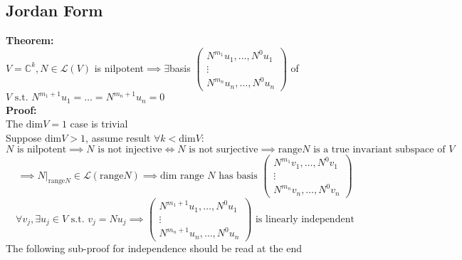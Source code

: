 \documentclass{article}
\newcommand{\st}{\mbox{ s.t. }}
\newcommand{\0}{{\bf{0}}}
\begin{document}
\subsection{Jordan Form}
\textbf{Theorem:}\\
$V=\mathbb{C}^k,N\in\mathcal{L}(V)$ is nilpotent$\implies\exists$basis $\begin{pmatrix}
    N^{m_1}u_1,\dots,N^0u_1\\
    \vdots\\
    N^{m_n}u_n,\dots,N^0u_n
\end{pmatrix}$ of $V\st N^{m_1+1}u_1=\dots=N^{m_n+1}u_n=0$\\
\textbf{Proof:}\\
The $\mbox{dim}V=1$ case is trivial\\
Suppose $\mbox{dim}V>1$, assume result $\forall k<\mbox{dim}V$:
$$N\mbox{ is nilpotent}\implies N\mbox{ is not injective}\iff N\mbox{ is not surjective}\implies\mbox{range}N\mbox{ is a true invariant subspace of }V$$
$$\implies N|_{\mbox{range}N}\in\mathcal{L}(\mbox{range}N)\implies\mbox{dim range }N\mbox{ has basis }\begin{pmatrix}
    N^{m_1}v_1,\dots,N^0v_1\\
    \vdots\\
    N^{m_n}v_n,\dots,N^0v_n
\end{pmatrix}$$
$$\forall v_j,\exists u_j\in V\st v_j=Nu_j\implies\begin{pmatrix}
    N^{m_1+1}u_1,\dots,N^0u_1\\
    \vdots\\
    N^{m_n+1}u_n,\dots,N^0u_n
\end{pmatrix}\mbox{ is linearly independent}$$
\null\hfill{The following sub-proof for independence should be read at the end}
\end{document}
